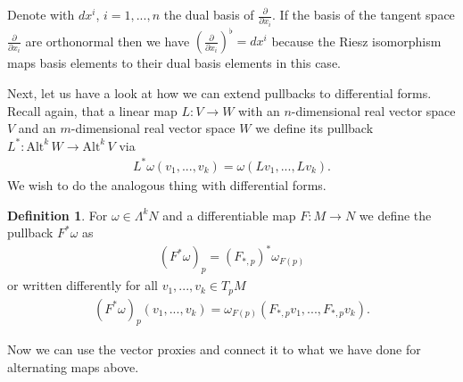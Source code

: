 \documentclass[12pt,a4paper]{article}
\numberwithin{equation}{subsection}
\numberwithin{lemma}{subsection}
\theoremstyle{definition}
\newtheorem{definition}[lemma]{Definition}
\newcommand{\alternating}[2]{ {\text{Alt}^{#1}\,#2} }
\begin{document}
Denote with $dx^i$, $i=1, ..., n$ the dual basis of 
$\frac{\partial}{\partial x_i}$.
If the basis of the tangent space $\frac{\partial}{\partial x_i}$ are 
orthonormal then we have $(\frac{\partial}{\partial x_i})^\flat = dx^i$ 
because the Riesz isomorphism maps basis elements to their dual basis elements
in this case.

Next, let us have a look at how we can extend pullbacks to differential forms.
Recall again, that a linear map $L: V \rightarrow W$ with an 
$n$-dimensional real vector space $V$ and an 
$m$-dimensional real vector space $W$ we define its pullback 
$L^*: \alternating{k}{W} \rightarrow \alternating{k}{V}$ via 
\begin{align*}
    L^*\omega (v_1, ..., v_k) = \omega (Lv_1, ..., L v_k).
\end{align*} 
We wish to do the analogous thing with differential forms. 

\begin{definition}
    For $\omega \in \Lambda^k N$ and a differentiable map $F:M \rightarrow N$ 
    we define the pullback $F^*\omega$ as
    \begin{align*}
        (F^*\omega)_p = (F_{*,p})^* \omega_{F(p)}
    \end{align*}
    or written differently for all $v_1,...,v_k \in T_p M$
    \begin{align*}
        (F^*\omega)_p (v_1,...,v_k) = \omega_{F(p)}(F_{*,p} v_1, ..., F_{*,p} v_k).
    \end{align*}
\end{definition}
Now we can use the vector proxies and connect it to what we have done 
for alternating maps above. 
\end{document}
